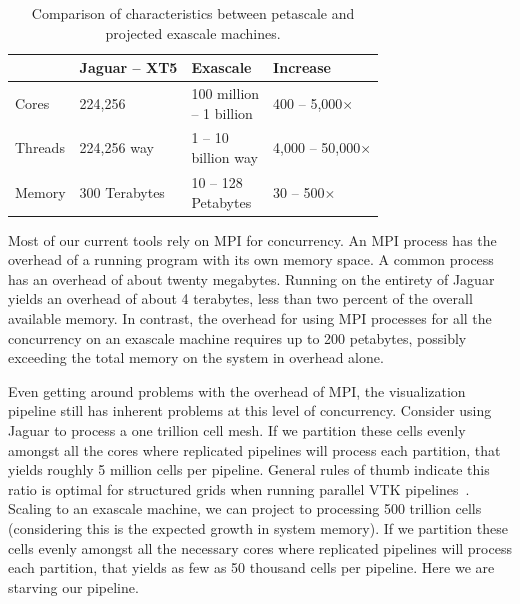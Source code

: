 \documentclass{vgtc}                          %
\newcommand*{\lcite}[1]{~\cite{#1}}
\begin{document}
\begin{table}[htbp]
  \centering
  \caption{Comparison of characteristics between petascale and projected
    exascale machines.}
  \label{table:PetaExaCompare}
  \vspace{6pt}
  \begin{tabular}{llll}
    & Jaguar -- XT5 & Exascale & Increase \\
    \hline
    Cores & 224,256
    & \parbox{.7in}{\vspace*{2pt}100 million\\ \hspace*{6pt} -- 1 billion\vspace*{2pt}}
    & 400 -- 5,000$\times$ \\
    Threads & 224,256 way
    & \parbox{.7in}{\vspace*{2pt}1 -- 10\\\hspace*{6pt}billion way\vspace*{2pt}}
    & \parbox{.65in}{\vspace*{2pt}4,000\\ \hspace*{6pt} -- 50,000$\times$\vspace*{2pt}} \\
    Memory & 300 Terabytes
    & \parbox{.7in}{\vspace*{2pt}10 -- 128\\\hspace*{6pt} Petabytes\vspace*{2pt}}
    & 30 -- 500$\times$
  \end{tabular}
\end{table}

Most of our current tools rely on MPI for concurrency.  An MPI process has
the overhead of a running program with its own memory space.  A common
process has an overhead of about twenty megabytes.  Running on the entirety
of Jaguar yields an overhead of about 4 terabytes, less than two percent of
the overall available memory.  In contrast, the overhead for using MPI
processes for all the concurrency on an exascale machine requires up to 200
petabytes, possibly exceeding the total memory on the system in overhead
alone.

Even getting around problems with the overhead of MPI, the visualization
pipeline still has inherent problems at this level of concurrency.
Consider using Jaguar to process a one trillion cell mesh.  If we partition
these cells evenly amongst all the cores where replicated pipelines will
process each partition, that yields roughly 5 million cells per pipeline.
General rules of thumb indicate this ratio is optimal for structured grids
when running parallel VTK pipelines\lcite{ParaViewTutorial}.  Scaling to an
exascale machine, we can project to processing 500 trillion cells
(considering this is the expected growth in system memory).  If we
partition these cells evenly amongst all the necessary cores where
replicated pipelines will process each partition, that yields as few as 50
thousand cells per pipeline.  Here we are starving our pipeline.
\end{document}

